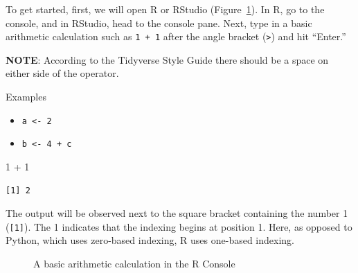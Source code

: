 \documentclass[
  letterpaper,
  DIV=11,
  numbers=noendperiod]{scrreprt}
\newenvironment{Shaded}{\begin{snugshade}}{\end{snugshade}}
\newcommand{\DecValTok}[1]{\textcolor[rgb]{0.68,0.00,0.00}{#1}}
\newcommand{\SpecialCharTok}[1]{\textcolor[rgb]{0.37,0.37,0.37}{#1}}
\providecommand{\tightlist}{%
  \setlength{\itemsep}{0pt}\setlength{\parskip}{0pt}}\usepackage{longtable,booktabs,array}
\begin{document}
To get started, first, we will open R or RStudio
(Figure~\ref{fig-arithmetic-1}). In R, go to the console, and in
RStudio, head to the console pane. Next, type in a basic arithmetic
calculation such as \texttt{1\ +\ 1} after the angle bracket
(\texttt{\textgreater{}}) and hit ``Enter.''

\textbf{NOTE}: According to the Tidyverse Style Guide there should be a
space on either side of the operator.

Examples

\begin{itemize}
\tightlist
\item
  \texttt{a\ \textless{}-\ 2}
\item
  \texttt{b\ \textless{}-\ 4\ +\ c}
\end{itemize}

\begin{Shaded}
\begin{Highlighting}[]
\DecValTok{1} \SpecialCharTok{+} \DecValTok{1}
\end{Highlighting}
\end{Shaded}

\begin{verbatim}
[1] 2
\end{verbatim}

The output will be observed next to the square bracket containing the
number 1 (\texttt{{[}1{]}}). The 1 indicates that the indexing begins at
position 1. Here, as opposed to Python, which uses zero-based indexing,
R uses one-based indexing.

\begin{figure}


\caption{\label{fig-arithmetic-1}A basic arithmetic calculation in the R
Console}

\end{figure}%
\end{document}
